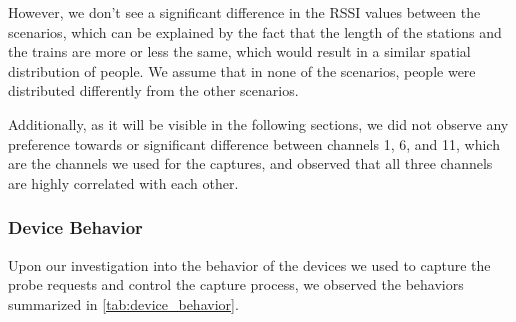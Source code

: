 \documentclass[sigconf,nonacm]{acmart}
\begin{document}
However, we don't see a significant difference in the RSSI values between the scenarios, which can be explained by the fact that the length of the stations and the trains are more or less the same, which would result in a similar spatial distribution of people. We assume that in none of the scenarios, people were distributed differently from the other scenarios.

Additionally, as it will be visible in the following sections, we did not observe any preference towards or significant difference between channels 1, 6, and 11, which are the channels we used for the captures, and observed that all three channels are highly correlated with each other.

\subsubsection{Device Behavior}

Upon our investigation into the behavior of the devices we used to capture the probe requests and control the capture process, we observed the behaviors summarized in \cref{tab:device_behavior}.

\begin{table}[H]
    \centering
    \caption{Probe request behavior of the smartphone and the controller laptop with and without power saving mode.}
    \label{tab:device_behavior}
\end{table}
\end{document}
